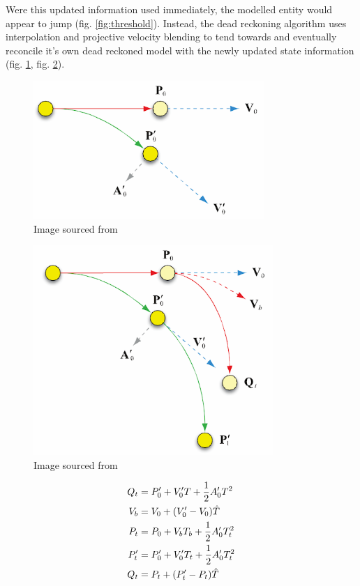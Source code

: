 \documentclass[journal]{IEEEtran}
\begin{document}
Were this updated information used immediately, the modelled entity would appear to jump (fig. \ref{fig:threshold}). Instead, the dead reckoning algorithm uses interpolation and projective velocity blending \cite{murphy2011believable} to tend towards and eventually reconcile it's own dead reckoned model with the newly updated state information (fig. \ref{fig:dr2}, fig. \ref{fig:dr3}).

\begin{figure}[h]
    \centering
    \includegraphics[width=0.7\linewidth]{DR2.png}
    \caption{Image sourced from \cite{murphy2011believable}}
    \label{fig:dr2}
\end{figure}

\begin{figure}[h]
    \centering
    \includegraphics[width=0.7\linewidth]{DR3.png}
    \caption{Image sourced from \cite{murphy2011believable}}
    \label{fig:dr3}
\end{figure}

\begin{align}
        Q_t & = {P'_0} + {V'_0} T + \frac{1}{2} {A'_0} T^2 \\
        V_b &= V_0 + ({V'_0} - {V_0}) \Hat{T}  \\
        P_t &= P_0 + {V_b}{T_b} + \frac{1}{2} {A'_0} {T_t^2}  \\
        P'_t &= {P'_0} + {V'_0}{T_t} + \frac{1}{2}{A'_0}{T_t^2}\\
        Q_t &= P_t + ({P'_t} - P_t ) \Hat{T} 
\end{align}
\end{document}

